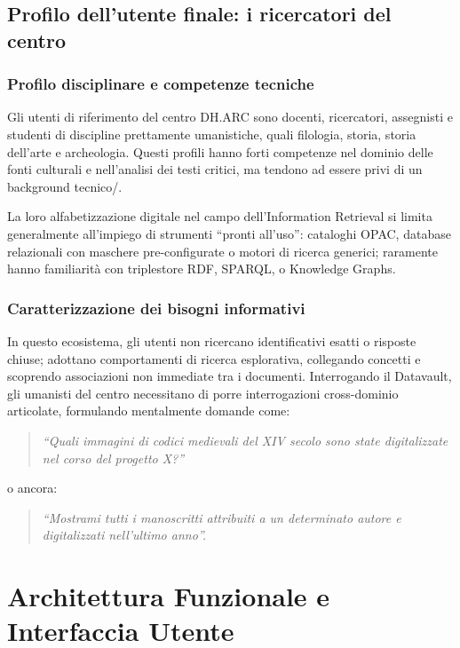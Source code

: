     \subsection{Profilo dell'utente finale: i ricercatori del centro}\label{subsec:utenti}

        \subsubsection{Profilo disciplinare e competenze tecniche}
            Gli utenti di riferimento del centro DH.ARC sono docenti, ricercatori, assegnisti e studenti di discipline prettamente umanistiche, quali filologia, storia, storia dell'arte e archeologia.\cite{Per22}
            Questi profili hanno forti competenze nel dominio delle fonti culturali e nell'analisi dei testi critici, ma tendono ad essere privi di un background tecnico\slash\@informatico. 

            La loro alfabetizzazione digitale nel campo dell'Information Retrieval si limita generalmente all'impiego di strumenti ``pronti all'uso'': cataloghi OPAC, database relazionali con maschere pre-configurate o motori di ricerca generici; raramente hanno familiarità con triplestore RDF, SPARQL, o Knowledge Graphs.

        \subsubsection{Caratterizzazione dei bisogni informativi}
            In questo ecosistema, gli utenti non ricercano identificativi esatti o risposte chiuse; adottano comportamenti di ricerca esplorativa, collegando concetti e scoprendo associazioni non immediate tra i documenti.
            Interrogando il Datavault, gli umanisti del centro necessitano di porre interrogazioni cross-dominio articolate, formulando mentalmente domande come: 

            \begin{quote}
                \textit{``Quali immagini di codici medievali del XIV secolo sono state digitalizzate nel corso del progetto X?\@''}
            \end{quote}
            o ancora:
            \begin{quote}
                \textit{``Mostrami tutti i manoscritti attribuiti a un determinato autore e digitalizzati nell'ultimo anno''.}
            \end{quote}

\section{Architettura Funzionale e Interfaccia Utente}\label{sec:architettura}

